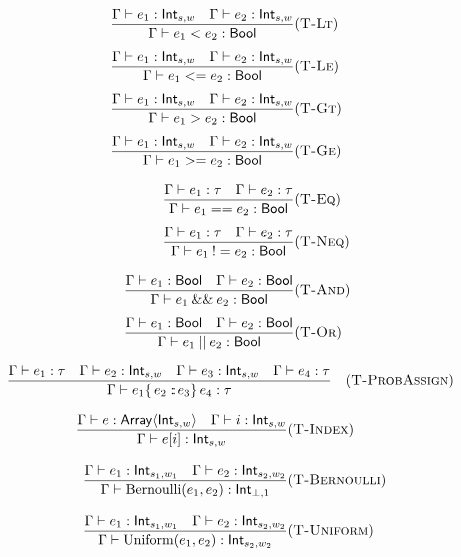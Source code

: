 \begin{multicols}{2}
  \[
    \begin{aligned}
      \frac{\Gamma \vdash e_1 : \mathsf{Int}_{s,w}
        \quad
        \Gamma \vdash e_2 : \mathsf{Int}_{s,w}}
      {\Gamma \vdash e_1 < e_2   : \mathsf{Bool}}
       & (\textsc{T-Lt})  \\[1ex]
      \frac{\Gamma \vdash e_1 : \mathsf{Int}_{s,w}
        \quad
        \Gamma \vdash e_2 : \mathsf{Int}_{s,w}}
      {\Gamma \vdash e_1 <= e_2 : \mathsf{Bool}}
       & (\textsc{T-Le})  \\[1ex]
      \frac{\Gamma \vdash e_1 : \mathsf{Int}_{s,w}
        \quad
        \Gamma \vdash e_2 : \mathsf{Int}_{s,w}}
      {\Gamma \vdash e_1 > e_2   : \mathsf{Bool}}
       & (\textsc{T-Gt})  \\[1ex]
      \frac{\Gamma \vdash e_1 : \mathsf{Int}_{s,w}
        \quad
        \Gamma \vdash e_2 : \mathsf{Int}_{s,w}}
      {\Gamma \vdash e_1 >= e_2 : \mathsf{Bool}}
       & (\textsc{T-Ge})  \\[2ex]
      \frac{\Gamma \vdash e_1 : \tau
        \quad
        \Gamma \vdash e_2 : \tau}
      {\Gamma \vdash e_1 == e_2 : \mathsf{Bool}}
       & (\textsc{T-Eq})  \\[1ex]
      \frac{\Gamma \vdash e_1 : \tau
        \quad
        \Gamma \vdash e_2 : \tau}
      {\Gamma \vdash e_1 \:!= e_2 : \mathsf{Bool}}
       & (\textsc{T-Neq}) \\[2ex]
      \frac{\Gamma \vdash e_1 : \mathsf{Bool}
        \quad
        \Gamma \vdash e_2 : \mathsf{Bool}}
      {\Gamma \vdash e_1 \:\&\&\: e_2 : \mathsf{Bool}}
       & (\textsc{T-And}) \\[1ex]
      \frac{\Gamma \vdash e_1 : \mathsf{Bool}
        \quad
        \Gamma \vdash e_2 : \mathsf{Bool}}
      {\Gamma \vdash e_1 \:||\: e_2 : \mathsf{Bool}}
       & (\textsc{T-Or})
    \end{aligned}
  \]
\end{multicols}

\[
  \frac{
    \Gamma \vdash e_1 : \tau
    \quad
    \Gamma \vdash e_2 : \mathsf{Int}_{s,w}
    \quad
    \Gamma \vdash e_3 : \mathsf{Int}_{s,w}
    \quad
    \Gamma \vdash e_4 : \tau
  }
  {\Gamma \vdash e_1 \{\,e_2 :\!:\! e_3\}\, e_4 : \tau}
  \quad(\textsc{T-ProbAssign})
\]

\[
  \begin{aligned}
    \frac{\Gamma\vdash e : \mathsf{Array}\langle\mathsf{Int}_{s,w}\rangle
      \quad
      \Gamma\vdash i : \mathsf{Int}_{s,w}}
    {\Gamma\vdash e[i] : \mathsf{Int}_{s,w}}
     & (\textsc{T-Index})     \\[2ex]
    \frac{\Gamma \vdash e_1 : \mathsf{Int}_{s_1,w_1}
      \quad
      \Gamma \vdash e_2 : \mathsf{Int}_{s_2,w_2}}
    {\Gamma \vdash \mathrm{Bernoulli}(e_1,e_2) : \mathsf{Int}_{\bot,1}}
     & (\textsc{T-Bernoulli}) \\[2ex]
    \frac{\Gamma \vdash e_1 : \mathsf{Int}_{s_1,w_1}
      \quad
      \Gamma \vdash e_2 : \mathsf{Int}_{s_2,w_2}}
    {\Gamma \vdash \mathrm{Uniform}(e_1,e_2) : \mathsf{Int}_{s_2,w_2}}
     & (\textsc{T-Uniform})
  \end{aligned}
\]
